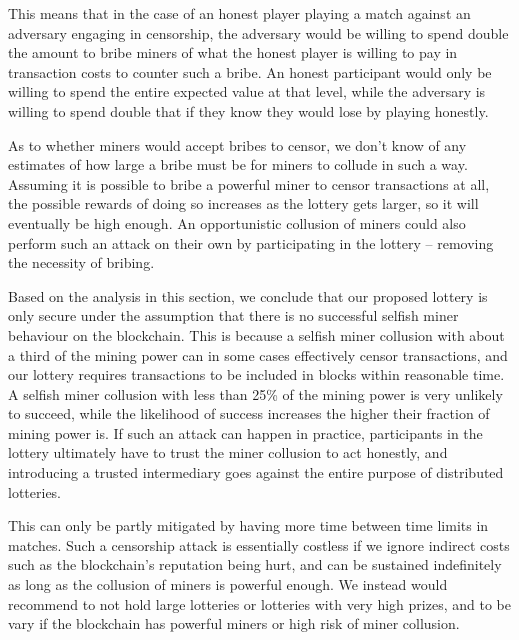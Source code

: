 This means that in the case of an honest player playing a match against an adversary engaging in censorship, the adversary would be willing to spend double the amount to bribe miners of what the honest player is willing to pay in transaction costs to counter such a bribe. An honest participant would only be willing to spend the entire expected value at that level, while the adversary is willing to spend double that if they know they would lose by playing honestly.

As to whether miners would accept bribes to censor, we don't know of any estimates of how large a bribe must be for miners to collude in such a way. Assuming it is possible to bribe a powerful miner to censor transactions at all, the possible rewards of doing so increases as the lottery gets larger, so it will eventually be high enough. An opportunistic collusion of miners could also perform such an attack on their own by participating in the lottery – removing the necessity of bribing.

Based on the analysis in this section, we conclude that our proposed lottery is only secure under the assumption that there is no successful selfish miner behaviour on the blockchain. This is because a selfish miner collusion with about a third of the mining power can in some cases effectively censor transactions, and our lottery requires transactions to be included in blocks within reasonable time. A selfish miner collusion with less than 25\% of the mining power is very unlikely to succeed, while the likelihood of success increases the higher their fraction of mining power is. If such an attack can happen in practice, participants in the lottery ultimately have to trust the miner collusion to act honestly, and introducing a trusted intermediary goes against the entire purpose of distributed lotteries. 

This can only be partly mitigated by having more time between time limits in matches. Such a censorship attack is essentially costless if we ignore indirect costs such as the blockchain's reputation being hurt, and can be sustained indefinitely as long as the collusion of miners is powerful enough. We instead would recommend to not hold large lotteries or lotteries with very high prizes, and to be vary if the blockchain has powerful miners or high risk of miner collusion.
